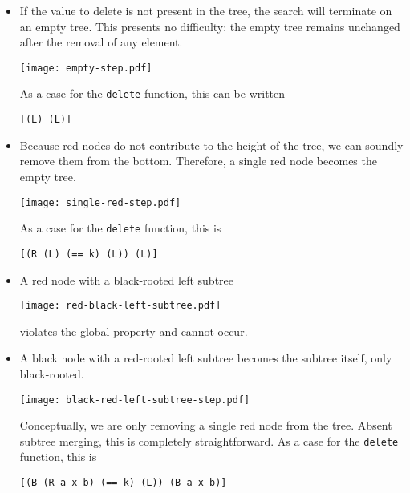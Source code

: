 \documentclass[preprint]{sigplanconf}
\begin{document}
\begin{itemize}

\item If the value to delete is not present in the tree, the search will terminate on an empty tree. This presents no difficulty: the empty tree remains unchanged after the removal of any element.
\begin{center}
\texttt{[image: empty-step.pdf]}
\end{center}
As a case for the \texttt{delete} function, this can be written
\begin{verbatim}
[(L) (L)]
\end{verbatim}


\item Because red nodes do not contribute to the height of the tree, we can soundly remove them from the bottom. Therefore, a single red node becomes the empty tree.
\begin{center}
\texttt{[image: single-red-step.pdf]}
\end{center}
As a case for the \texttt{delete} function, this is
\begin{verbatim}
[(R (L) (== k) (L)) (L)]
\end{verbatim}

\item A red node with a black-rooted left subtree
\begin{center}
\texttt{[image: red-black-left-subtree.pdf]}
\end{center}
violates the global property and cannot occur.

\item A black node with a red-rooted left subtree becomes the subtree itself, only black-rooted.
\begin{center}
\texttt{[image: black-red-left-subtree-step.pdf]}
\end{center}
Conceptually, we are only removing a single red node from the tree. Absent subtree merging, this is completely straightforward. As a case for the \texttt{delete} function, this is
\begin{verbatim}
[(B (R a x b) (== k) (L)) (B a x b)]
\end{verbatim}


\end{itemize}
\end{document}
